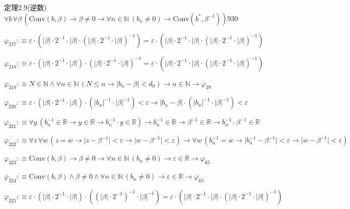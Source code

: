 \begin{fullproof}{定理2.9(逆数)}{$\forall b\,\forall \beta\,(\mathrm{Conv}(b,\beta) \to \beta \neq 0 \to \forall n \in \mathbb{N}\,(b_{n} \neq 0) \to \mathrm{Conv}(b^{\ast},\beta^{-1}))$}{930}
\begin{abbrevlist}
\item $\varphi_{217} :\equiv \varepsilon \cdot (\lvert \beta \rvert \cdot 2^{-1} \cdot \lvert \beta \rvert \cdot (\lvert \beta \rvert \cdot 2^{-1} \cdot \lvert \beta \rvert)^{-1}) = \varepsilon \cdot (\lvert \beta \rvert \cdot 2^{-1} \cdot \lvert \beta \rvert \cdot (\lvert \beta \rvert \cdot 2^{-1} \cdot \lvert \beta \rvert)^{-1})$
\item $\varphi_{218} :\equiv \varepsilon \cdot (\lvert \beta \rvert \cdot 2^{-1} \cdot \lvert \beta \rvert) \cdot (\lvert \beta \rvert \cdot 2^{-1} \cdot \lvert \beta \rvert)^{-1} = \varepsilon \cdot (\lvert \beta \rvert \cdot 2^{-1} \cdot \lvert \beta \rvert \cdot (\lvert \beta \rvert \cdot 2^{-1} \cdot \lvert \beta \rvert)^{-1})$
\item $\varphi_{219} :\equiv N \in \mathbb{N} \land \forall n \in \mathbb{N}\,(N \leq n \to \lvert b_{n} - \beta \rvert < d_{0}) \to n \in \mathbb{N} \to \varphi_{29}$
\item $\varphi_{220} :\equiv \varepsilon \cdot (\lvert \beta \rvert \cdot 2^{-1} \cdot \lvert \beta \rvert) \cdot (\lvert b_{n} \rvert^{-1} \cdot \lvert \beta \rvert^{-1}) < \varepsilon \to \lvert b_{n} - \beta \rvert \cdot (\lvert b_{n} \rvert^{-1} \cdot \lvert \beta \rvert^{-1}) < \varepsilon$
\item $\varphi_{221} :\equiv \forall y\,(b_{n}^{-1} \in \mathbb{R} \to y \in \mathbb{R} \to b_{n}^{-1} \cdot y \in \mathbb{R}) \to b_{n}^{-1} \in \mathbb{R} \to \beta^{-1} \in \mathbb{R} \to b_{n}^{-1} \cdot \beta^{-1} \in \mathbb{R}$
\item $\varphi_{222} :\equiv \forall z\,\forall w\,(z = w \to \lvert z - \beta^{-1} \rvert < \varepsilon \to \lvert w - \beta^{-1} \rvert < \varepsilon) \to \forall w\,(b_{n}^{-1} = w \to \lvert b_{n}^{-1} - \beta^{-1} \rvert < \varepsilon \to \lvert w - \beta^{-1} \rvert < \varepsilon)$
\item $\varphi_{223} :\equiv \mathrm{Conv}(b,\beta) \to \beta \neq 0 \to \forall n \in \mathbb{N}\,(b_{n} \neq 0) \to \varepsilon \in \mathbb{R} \to \varphi_{65}$
\item $\varphi_{224} :\equiv \mathrm{Conv}(b,\beta) \land \beta \neq 0 \land \forall n \in \mathbb{N}\,(b_{n} \neq 0) \to \varepsilon \in \mathbb{R} \to \varphi_{65}$
\item $\varphi_{225} :\equiv \varepsilon \cdot (\lvert \beta \rvert \cdot 2^{-1} \cdot \lvert \beta \rvert) \cdot ((\lvert \beta \rvert \cdot 2^{-1})^{-1} \cdot \lvert \beta \rvert^{-1}) = \varepsilon \cdot (\lvert \beta \rvert \cdot 2^{-1} \cdot \lvert \beta \rvert \cdot (\lvert \beta \rvert \cdot 2^{-1} \cdot \lvert \beta \rvert)^{-1})$

\end{abbrevlist}
\end{fullproof}
